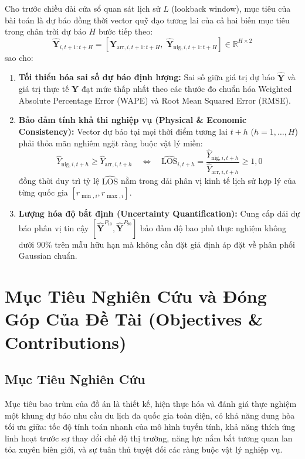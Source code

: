 Cho trước chiều dài cửa sổ quan sát lịch sử $L$ (lookback window), mục tiêu của bài toán là dự báo đồng thời vector quỹ đạo tương lai của cả hai biến mục tiêu trong chân trời dự báo $H$ bước tiếp theo:
\begin{equation}
    \hat{\mathbf{Y}}_{i, t+1:t+H} = \left[ \hat{\mathbf{Y}}_{\text{arr}, i, t+1:t+H}, \; \hat{\mathbf{Y}}_{\text{nig}, i, t+1:t+H} \right] \in \mathbb{R}^{H \times 2}
\end{equation}
sao cho:
\begin{enumerate}
    \item \textbf{Tối thiểu hóa sai số dự báo định lượng:} Sai số giữa giá trị dự báo $\hat{\mathbf{Y}}$ và giá trị thực tế $\mathbf{Y}$ đạt mức thấp nhất theo các thước đo chuẩn hóa Weighted Absolute Percentage Error (WAPE) và Root Mean Squared Error (RMSE).
    \item \textbf{Bảo đảm tính khả thi nghiệp vụ (Physical \& Economic Consistency):} Vector dự báo tại mọi thời điểm tương lai $t+h$ ($h = 1, \dots, H$) phải thỏa mãn nghiêm ngặt ràng buộc vật lý miền:
    \begin{equation}
        \hat{Y}_{\text{nig}, i, t+h} \ge \hat{Y}_{\text{arr}, i, t+h} \quad \Longleftrightarrow \quad \widehat{\text{LOS}}_{i, t+h} = \frac{\hat{Y}_{\text{nig}, i, t+h}}{\hat{Y}_{\text{arr}, i, t+h}} \ge 1{,}0
    \end{equation}
    đồng thời duy trì tỷ lệ $\widehat{\text{LOS}}$ nằm trong dải phân vị kinh tế lịch sử hợp lý của từng quốc gia $[r_{\min, i}, r_{\max, i}]$.
    \item \textbf{Lượng hóa độ bất định (Uncertainty Quantification):} Cung cấp dải dự báo phân vị tin cậy $[\hat{\mathbf{Y}}^{P_{10}}, \hat{\mathbf{Y}}^{P_{90}}]$ bảo đảm độ bao phủ thực nghiệm không dưới 90\% trên mẫu hữu hạn mà không cần đặt giả định áp đặt về phân phối Gaussian chuẩn.
\end{enumerate}

\section{Mục Tiêu Nghiên Cứu và Đóng Góp Của Đề Tài (Objectives \& Contributions)}
\label{sec:objectives}

\subsection{Mục Tiêu Nghiên Cứu}
Mục tiêu bao trùm của đồ án là thiết kế, hiện thực hóa và đánh giá thực nghiệm một khung dự báo nhu cầu du lịch đa quốc gia toàn diện, có khả năng dung hòa tối ưu giữa: tốc độ tính toán nhanh của mô hình tuyến tính, khả năng thích ứng linh hoạt trước sự thay đổi chế độ thị trường, năng lực nắm bắt tương quan lan tỏa xuyên biên giới, và sự tuân thủ tuyệt đối các ràng buộc vật lý nghiệp vụ.

